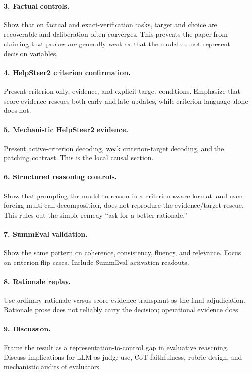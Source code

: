 \documentclass[11pt]{article}
\begin{document}
\paragraph{3. Factual controls.}
Show that on factual and exact-verification tasks, target and choice are
recoverable and deliberation often converges. This prevents the paper from
claiming that probes are generally weak or that the model cannot represent
decision variables.

\paragraph{4. HelpSteer2 criterion confirmation.}
Present criterion-only, evidence, and explicit-target conditions. Emphasize
that score evidence rescues both early and late updates, while criterion
language alone does not.

\paragraph{5. Mechanistic HelpSteer2 evidence.}
Present active-criterion decoding, weak criterion-target decoding, and the
patching contrast. This is the local causal section.

\paragraph{6. Structured reasoning controls.}
Show that prompting the model to reason in a criterion-aware format, and even
forcing multi-call decomposition, does not reproduce the evidence/target
rescue. This rules out the simple remedy ``ask for a better rationale.''

\paragraph{7. SummEval validation.}
Show the same pattern on coherence, consistency, fluency, and relevance. Focus
on criterion-flip cases. Include SummEval activation readouts.

\paragraph{8. Rationale replay.}
Use ordinary-rationale versus score-evidence transplant as the final
adjudication. Rationale prose does not reliably carry the decision; operational
evidence does.

\paragraph{9. Discussion.}
Frame the result as a representation-to-control gap in evaluative reasoning.
Discuss implications for LLM-as-judge use, CoT faithfulness, rubric design,
and mechanistic audits of evaluators.
\end{document}
